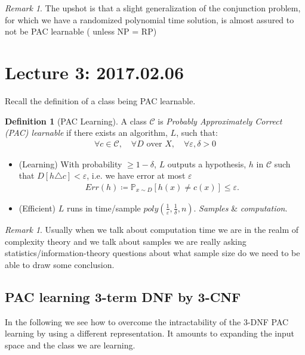 \documentclass[12pt, letterpaper]{article}
\numberwithin{equation}{section} %
\newcommand{\mb}{\mathbb}
\newcommand{\mc}{\mathcal}
\newcommand{\ve}{\varepsilon}
\theoremstyle{definition}
\newtheorem{definition}[theorem]{Definition}
\theoremstyle{remark}
\newtheorem{remark}[theorem]{Remark}
\begin{document}
\begin{remark}
    The upshot is that a slight generalization of the conjunction problem, for which we have a randomized polynomial time solution, is almost assured to not be PAC learnable ( unless NP = RP)
\end{remark}




\section{Lecture 3: 2017.02.06}

Recall the definition of a class being PAC learnable.
\begin{definition}[PAC Learning]
	A class $\mc C$ is \emph{Probably Approximately Correct (PAC) learnable} if there exists an algorithm, $L$, such that:
	\begin{align}
    	\forall c \in \mc C,\quad \forall D \textrm{ over }X,\quad \forall \ve,\delta > 0
	\end{align}
	\begin{itemize}
		\item (Learning) With probability $\geq 1 -\delta$, $L$ outputs a hypothesis, $h$ in $\mc
		C$ such that $D[h\triangle c]<\ve$, i.e. we have error at most $\ve$
		\begin{align}
    		Err(h) \coloneqq \mb P_{x\sim D}[h(x) \ne c(x)] \leq \ve.
		\end{align}
		\item (Efficient) $L$ runs in time/sample $poly\left(\frac1\ve, \frac1\delta, n\right)$. \emph{Samples} \& \emph{computation}.
	\end{itemize}
\end{definition}
\begin{remark}
    Usually when we talk about computation time we are in the realm of complexity theory and we talk about samples we are really asking statistics/information-theory questions about what sample size do we need to be able to draw some conclusion.
\end{remark}

\subsection{PAC learning 3-term DNF by 3-CNF}
In the following we see how to overcome the intractability of the 3-DNF PAC learning by using a different representation. It amounts to expanding the input space and the class we are learning.
\end{document}
